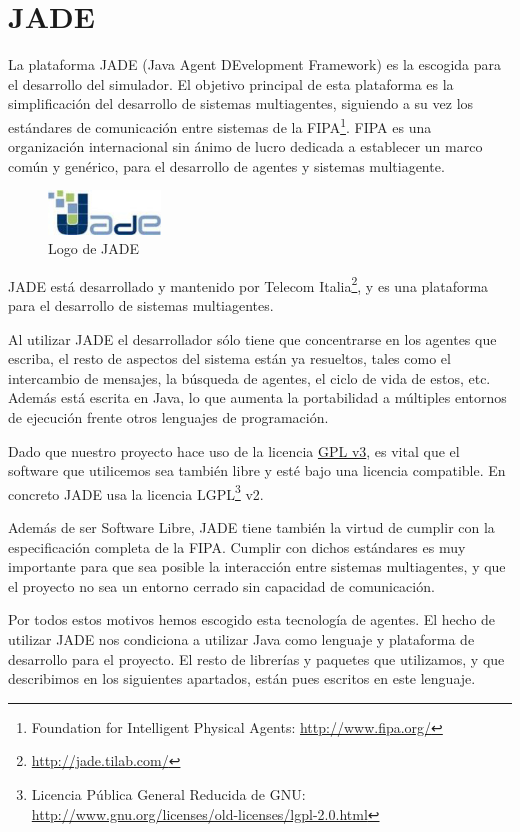 \section*{JADE}

La plataforma JADE (Java Agent DEvelopment Framework) es la escogida para el
desarrollo del simulador. El objetivo principal de esta plataforma es la
simplificación del desarrollo de sistemas multiagentes, siguiendo a su vez los
estándares de comunicación entre sistemas de la FIPA\footnote{Foundation for
Intelligent Physical Agents: \url{http://www.fipa.org/}}. FIPA es una
organización internacional sin ánimo de lucro dedicada a establecer un marco
común y genérico, para el desarrollo de agentes y sistemas multiagente.

\begin{figure}[H]
 \centering
 \includegraphics[width=30mm]{figuras/cap4/jade.png}
 \caption{Logo de JADE}
\end{figure}

JADE está desarrollado y mantenido por Telecom
Italia\footnote{\url{http://jade.tilab.com/}}, y es una plataforma para el
desarrollo de sistemas multiagentes.

Al utilizar JADE el desarrollador sólo tiene que concentrarse en los agentes
que escriba, el resto de aspectos del sistema están ya resueltos, tales como el
intercambio de mensajes, la búsqueda de agentes, el ciclo de vida de estos,
etc. Además está escrita en Java, lo que aumenta la portabilidad a múltiples
entornos de ejecución frente otros lenguajes de programación.

Dado que nuestro proyecto hace uso de la licencia \hyperref[ap1]{GPL v3}, es
vital que el software que utilicemos sea también libre y esté bajo una licencia
compatible. En concreto JADE usa la licencia LGPL\footnote{Licencia Pública
General Reducida de GNU:
\url{http://www.gnu.org/licenses/old-licenses/lgpl-2.0.html}} v2.

Además de ser Software Libre, JADE tiene también la virtud de cumplir con la
especificación completa de la FIPA. Cumplir con dichos estándares es muy
importante para que sea posible la interacción entre sistemas multiagentes, y
que el proyecto no sea un entorno cerrado sin capacidad de comunicación.

Por todos estos motivos hemos escogido esta tecnología de agentes. El hecho de
utilizar JADE nos condiciona a utilizar Java como lenguaje y plataforma de
desarrollo para el proyecto. El resto de librerías y paquetes que utilizamos, y
que describimos en los siguientes apartados, están pues escritos en este
lenguaje.

